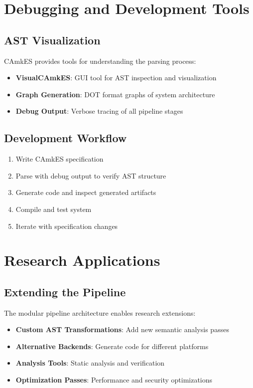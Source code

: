\documentclass[12pt,a4paper]{article}
\begin{document}
\section{Debugging and Development Tools}

\subsection{AST Visualization}
CAmkES provides tools for understanding the parsing process:

\begin{itemize}
    \item \textbf{VisualCAmkES}: GUI tool for AST inspection and visualization
    \item \textbf{Graph Generation}: DOT format graphs of system architecture
    \item \textbf{Debug Output}: Verbose tracing of all pipeline stages
\end{itemize}

\subsection{Development Workflow}
\begin{enumerate}
    \item Write CAmkES specification
    \item Parse with debug output to verify AST structure
    \item Generate code and inspect generated artifacts
    \item Compile and test system
    \item Iterate with specification changes
\end{enumerate}

\section{Research Applications}

\subsection{Extending the Pipeline}
The modular pipeline architecture enables research extensions:

\begin{itemize}
    \item \textbf{Custom AST Transformations}: Add new semantic analysis passes
    \item \textbf{Alternative Backends}: Generate code for different platforms
    \item \textbf{Analysis Tools}: Static analysis and verification
    \item \textbf{Optimization Passes}: Performance and security optimizations
\end{itemize}
\end{document}
